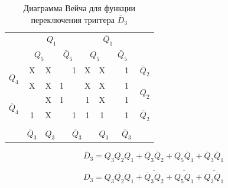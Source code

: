 \documentclass[a4paper,14pt]{article}
\begin{document}
\begin{table}[H]
	\begin{center}
		\caption{\label{tab:unD3_tab} Диаграмма Вейча для функции переключения триггера $\overline{D}_3$ }
		\begin{tabular}{cccccccccc}
			& \multicolumn{4}{c}{$Q_1$} & \multicolumn{4}{c}{$\bar{Q}_1$} &  \\
			& \multicolumn{2}{c}{$Q_5$} & \multicolumn{2}{c}{$\bar{Q}_5$} & \multicolumn{2}{c}{$Q_5$} & \multicolumn{2}{c}{$\bar{Q}_5$} &  \\ \cline{2-9}
			\multicolumn{1}{c|}{\multirow{2}{*}{$Q_4$}} & \multicolumn{1}{c|}{X} & \multicolumn{1}{c|}{X} & \multicolumn{1}{c|}{} & \multicolumn{1}{c|}{1} & \multicolumn{1}{c|}{X} & \multicolumn{1}{c|}{X} & \multicolumn{1}{c|}{} & \multicolumn{1}{c|}{1} & $\bar{Q}_2$ \\ \cline{2-9}
			\multicolumn{1}{c|}{} & \multicolumn{1}{c|}{X} & \multicolumn{1}{c|}{X} & \multicolumn{1}{c|}{1} & \multicolumn{1}{c|}{} & \multicolumn{1}{c|}{X} & \multicolumn{1}{c|}{X} & \multicolumn{1}{c|}{} & \multicolumn{1}{c|}{1} & \multirow{2}{*}{$Q_2$} \\ \cline{2-9}
			\multicolumn{1}{c|}{\multirow{2}{*}{$\bar{Q}_4$}} & \multicolumn{1}{c|}{} & \multicolumn{1}{c|}{X} & \multicolumn{1}{c|}{1} & \multicolumn{1}{c|}{} & \multicolumn{1}{c|}{1} & \multicolumn{1}{c|}{X} & \multicolumn{1}{c|}{} & \multicolumn{1}{c|}{1} &  \\ \cline{2-9}
			\multicolumn{1}{c|}{} & \multicolumn{1}{c|}{1} & \multicolumn{1}{c|}{X} & \multicolumn{1}{c|}{} & \multicolumn{1}{c|}{1} & \multicolumn{1}{c|}{1} & \multicolumn{1}{c|}{1} & \multicolumn{1}{c|}{} & \multicolumn{1}{c|}{1} & $\bar{Q}_2$ \\ \cline{2-9}
			&  & \multicolumn{2}{c}{} & \multicolumn{2}{c}{} & \multicolumn{2}{c}{} &  &  \\
			\multicolumn{1}{l}{} & \multicolumn{1}{l}{$\bar{Q}_3$} & \multicolumn{2}{l}{$Q_3$} & \multicolumn{2}{l}{$\bar{Q}_3$} & \multicolumn{2}{l}{$Q_3$} & \multicolumn{1}{l}{$\bar{Q}_3$} & \multicolumn{1}{l}{}
		\end{tabular}
	\end{center}
\end{table}

$$\overline{D}_3 = Q_3Q_2Q_1 + \overline{Q}_3\overline{Q}_2 + Q_5\overline{Q}_1 + \overline{Q}_3\overline{Q}_1$$

$$D_3 = \overline{Q_3Q_2Q_1} + \overline{\overline{Q}_3\overline{Q}_2} + \overline{Q_5\overline{Q}_1} + \overline{\overline{Q}_3\overline{Q}_1}$$
\end{document}
